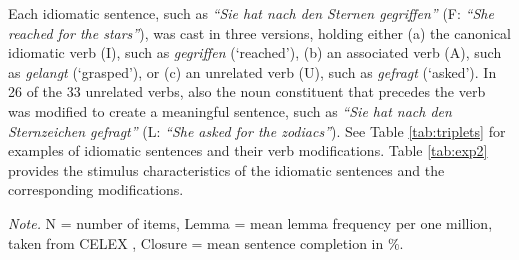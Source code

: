 Each idiomatic sentence, such as \textit{``Sie hat nach den Sternen gegriffen''} (F: \textit{``She reached for the stars''}), was cast in three versions, holding either (a) the canonical idiomatic verb (I), such as \textit{gegriffen} (‘reached’), (b) an associated verb (A), such as \textit{gelangt} (‘grasped’), or (c) an unrelated verb (U), such as \textit{gefragt} (‘asked’). In 26 of the 33 unrelated verbs, also the noun constituent that precedes the verb was modified to create a meaningful sentence, such as \textit{``Sie hat nach den Sternzeichen gefragt''} (L: \textit{``She asked for the zodiacs''}). See Table \ref{tab:triplets} for examples of idiomatic sentences and their verb modifications.  Table \ref{tab:exp2} provides the stimulus characteristics of the idiomatic sentences and the corresponding modifications.

\begin{table}[]
\caption{\textit{Idiomatic Sentences and Stimulus Characteristics of the Idiomatic, Modified, and Unrelated Verb Constituents in Experiment 2.}}
\label{tab:exp2}
\footnotesize{\textit{Note.} N = number of items, Lemma = mean lemma frequency per one million, taken from CELEX \citep{baayen:1993}, Closure = mean sentence completion in \%.}
\end{table}

